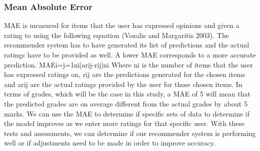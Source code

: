 \subsubsection{Mean Absolute Error}
MAE is measured for items that the user has expressed opinions and given a rating to using the following equation (Vozalis and Margaritis 2003). The recommender system has to have generated its list of predictions and the actual ratings have to be provided as well. A lower MAE corresponds to a more accurate prediction.
MAEi=j=1ni|arij-rij|ni
Where ni is the number of items that the user has expressed ratings on, rij are the predictions generated for the chosen items and arij are the actual ratings provided by the user for those chosen items.
In terms of grades, which will be the case in this study, a MAE of 5 will mean that the predicted grades are on average different from the actual grades by about 5 marks.
We can use the MAE to determine if specific sets of data to determine if the model improves as we enter more ratings for that specific user. With these tests and assessments, we can determine if our recommender system is performing well or if adjustments need to be made in order to improve accuracy.

